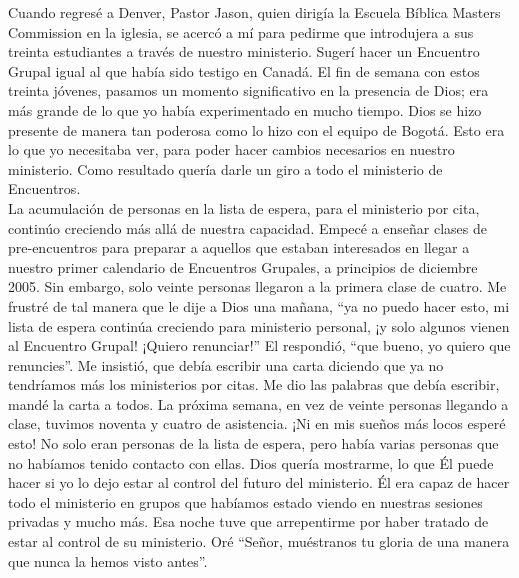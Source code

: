 \documentclass[twoside, 12pt]{book}
\begin{document}
Cuando regresé a Denver, Pastor Jason, quien dirigía la Escuela Bíblica Masters Commission en la iglesia, se acercó a mí para pedirme que introdujera a sus treinta estudiantes a través de nuestro ministerio. Sugerí hacer un Encuentro Grupal igual al que había sido testigo en Canadá. El fin de semana con estos treinta jóvenes, pasamos un momento significativo en la presencia de Dios; era más grande de lo que yo había experimentado en mucho tiempo. Dios se hizo presente de manera tan poderosa como lo hizo con el equipo de Bogotá. Esto era lo que yo necesitaba ver, para poder hacer cambios necesarios en nuestro ministerio. Como resultado quería darle un giro a todo el ministerio de Encuentros.\\

La acumulación de personas en la lista de espera, para el ministerio por cita, continúo creciendo más allá de nuestra capacidad. Empecé a enseñar clases de pre-encuentros para preparar a aquellos que estaban interesados en llegar a nuestro primer calendario de Encuentros Grupales, a principios de diciembre 2005. Sin embargo, solo veinte personas llegaron a la primera clase de cuatro. Me frustré de tal manera que le dije a Dios una mañana, “ya no puedo hacer esto, mi lista de espera continúa creciendo para ministerio personal, ¡y solo algunos vienen al Encuentro Grupal! ¡Quiero renunciar!” El respondió, “que bueno, yo quiero que renuncies”. Me insistió, que debía escribir una carta diciendo que ya no tendríamos más los ministerios por citas. Me dio las palabras que debía escribir, mandé la carta a todos. La próxima semana, en vez de veinte personas llegando a clase, tuvimos noventa y cuatro de asistencia. ¡Ni en mis sueños más locos esperé esto! No solo eran personas de la lista de espera, pero había varias personas que no habíamos tenido contacto con ellas. Dios quería mostrarme, lo que Él puede hacer si yo lo dejo estar al control del futuro del ministerio. Él era capaz de hacer todo el ministerio en grupos que habíamos estado viendo en nuestras sesiones privadas y mucho más. Esa noche tuve que arrepentirme por haber tratado de estar al control de su ministerio. Oré “Señor, muéstranos tu gloria de una manera que nunca la hemos visto antes”.\\
\end{document}
